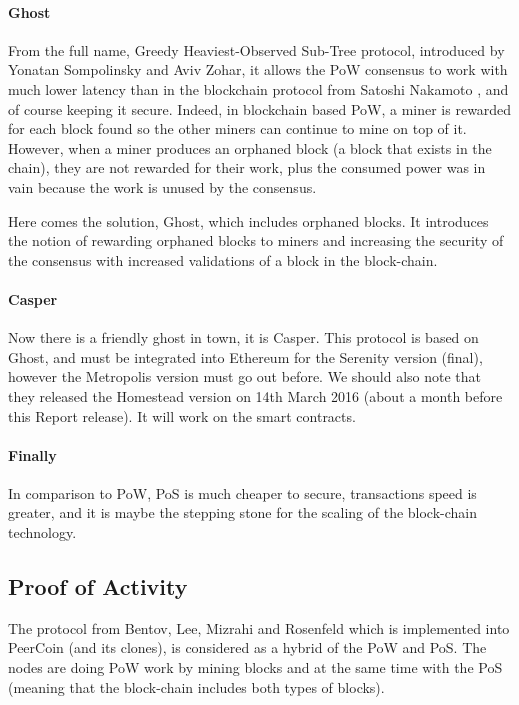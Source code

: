 \paragraph{Ghost}
From the full name, Greedy Heaviest-Observed Sub-Tree protocol, introduced by Yonatan Sompolinsky and Aviv Zohar\cite{Sompolinsky2014AcceleratingChains}, it allows the PoW consensus to work with much lower latency than in the blockchain protocol from Satoshi Nakamoto \cite{SatoshiNakamoto2008Bitcoin:System}, and of course keeping it secure. Indeed, in blockchain based PoW, a miner is rewarded for each block found so the other miners can continue to mine on top of it. However, when a miner produces an orphaned block (a block that exists in the chain), they are not rewarded for their work, plus the consumed power was in vain because the work is unused by the consensus.

Here comes the solution, Ghost, which includes orphaned blocks. It introduces the notion of rewarding orphaned blocks to miners and increasing the security of the consensus with increased validations of a block in the block-chain.

\paragraph{Casper}
Now there is a friendly ghost in town, it is Casper\cite{Buterin2015UnderstandingCasper}. This protocol is based on Ghost, and must be integrated into Ethereum for the Serenity\cite{Buterin2014SlasherStake} version (final), however the Metropolis version must go out before. We should also note that they released the Homestead version on 14th March 2016 (about a month before this Report release). It will work on the smart contracts.

\paragraph{Finally}
In comparison to PoW, PoS is much cheaper to secure, transactions speed is greater, and it is maybe the stepping stone for the scaling of the block-chain technology.

\subsection{Proof of Activity}
The protocol from Bentov, Lee, Mizrahi and Rosenfeld  \cite{Bentov2013ProofStake} which is implemented into PeerCoin (and its clones), is considered as a hybrid of the PoW and PoS. The nodes are doing PoW work by mining blocks and at the same time with the PoS (meaning that the block-chain includes both types of blocks).

